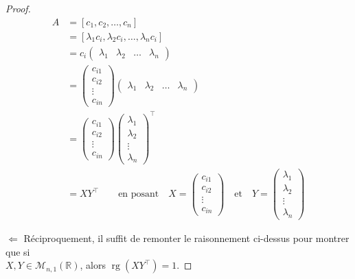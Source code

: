 \documentclass[a4paper]{article}
\begin{document}
\begin{proof}
    \begin{align*}
        A &= [c_1, c_2, \dots , c_n]\\
        &= [\lambda_1 c_i, \lambda_2 c_i, \dots , \lambda_n c_i]\\
        &= c_i \begin{pmatrix}\lambda_1 & \lambda_2 & \dots & \lambda_n \end{pmatrix}\\
        &= \begin{pmatrix}c_{i1} \\ c_{i2} \\ \vdots \\ c_{in} \end{pmatrix} \begin{pmatrix}\lambda_1 & \lambda_2 & \dots & \lambda_n \end{pmatrix}\\
        &= \begin{pmatrix}c_{i1} \\ c_{i2} \\ \vdots \\ c_{in} \end{pmatrix} \begin{pmatrix}\lambda_1 \\ \lambda_2 \\ \vdots \\ \lambda_n \end{pmatrix}^\top\\
        &= XY^\top \qquad \text{en posant}   \quad X = \begin{pmatrix}c_{i1} \\ c_{i2} \\ \vdots \\ c_{in} \end{pmatrix} \quad \text{et} \quad Y = \begin{pmatrix}\lambda_1 \\ \lambda_2 \\ \vdots \\ \lambda_n \end{pmatrix}
    \end{align*}
    
    $\boxed{\Leftarrow}$ Réciproquement, il suffit de remonter le raisonnement ci-dessus pour montrer que si \\ $X, Y \in \mathcal{M}_{n, 1}(\mathbb{R})$, alors $\operatorname{rg}\left(XY^\top\right)=1$.
    
\end{proof}
\end{document}
